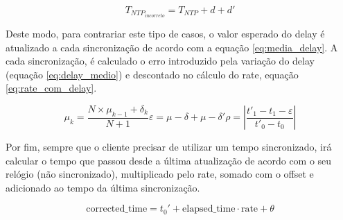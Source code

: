 \begin{equation} \label{eq:pior_caso}
    T_{NTP_{incorreto}} = T_{NTP} + d + d'
\end{equation}

Deste modo, para contrariar este tipo de casos, o valor esperado do delay é atualizado a cada sincronização de acordo com a equação \ref{eq:media_delay}. A cada sincronização, é calculado o erro introduzido pela variação do delay (equação \ref{eq:delay_medio}) e descontado no cálculo do rate, equação \ref{eq:rate_com_delay}.


\begin{subequations}
    \begin{equation} \label{eq:media_delay}
        \mu_k = \frac{N \times \mu_{k-1} + \delta_k}{N+1}
    \end{equation}
    
    \begin{equation} \label{eq:delay_medio}
        \varepsilon = \mu - \delta + \mu - \delta'
    \end{equation}
    
    \begin{equation} \label{eq:rate_com_delay}
        \rho = \left| \frac{t'_1 - t_1 -\varepsilon}{t'_0-t_0} \right|
    \end{equation}
\end{subequations}



Por fim, sempre que o cliente precisar de utilizar um tempo sincronizado, irá calcular o tempo que passou desde a última atualização de acordo com o seu relógio (não sincronizado), multiplicado pelo rate, somado com o offset e adicionado ao tempo da última sincronização. 

\begin{equation} \label{eq:corrected_time}
    \text{{corrected\_time}} = t_{\text{0}}' + \text{{elapsed\_time}} \cdot \text{{rate}} + \theta
\end{equation}



